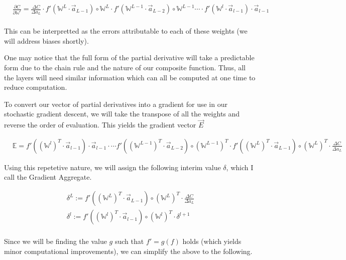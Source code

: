 \documentclass[8pt]{amsart}
\newcommand\mat[1]{\mathbb{#1}}
\begin{document}
\[
    \begin{aligned}
        & \frac{ \partial C }{ \partial \mat{W}^l } = \frac{ \Delta C }{ \Delta a_L }
            \cdot
                f'(\mat{W}^L \cdot \vec{a}_{L - 1}) \circ \mat{W}^L
            \cdot
                f'(\mat{W}^{L - 1} \cdot \vec{a}_{L - 2}) \circ \mat{W}^{L - 1}
            \cdots
            \cdot
                f'(\mat{W}^l \cdot \vec{a}_{l - 1}) \cdot \vec{a}_{l - 1} \\
    \end{aligned}
\]

This can be interpretted as the errors attributable to each of these weights (we will
address biases shortly).

One may notice that the full form of the partial derivative will take a
predictable form due to the chain rule and the nature of our composite function.
Thus, all the layers will need similar information which can all be computed
at one time to reduce computation.

To convert our vector of partial derivatives into a gradient for use in our stochastic
gradient descent, we will take the transpose of all the weights and reverse the order
of evaluation. This yields the gradient vector $\vec{E}$

\[
    \begin{aligned}
        & \mat{E} = f'( (\mat{W}^l)^T \cdot \vec{a}_{l - 1}) \cdot \vec{a}_{l - 1}
            \cdot
            \cdots
                f'( (\mat{W}^{L - 1})^T \cdot \vec{a}_{L - 2} ) \circ (\mat{W}^{L - 1})^T
            \cdot
                f'( (\mat{W}^L)^T \cdot \vec{a}_{L - 1} ) \circ (\mat{W}^L)^T
            \cdot
                \frac{ \Delta C }{ \Delta a_L }
    \end{aligned}
\]

Using this repetetive nature, we will assign the following interim value $\delta$,
which I call the Gradient Aggregate.

\[
    \begin{aligned}
        \delta^L := f'( (\mat{W}^L)^T \cdot \vec{a}_{L - 1} ) \circ (\mat{W}^L)^T \cdot \frac{ \Delta C }{ \Delta a_L } \\
        \delta^l := f'( (\mat{W}^{l})^T \cdot \vec{a}_{l - 1} ) \circ (\mat{W}^{l})^T \cdot \delta^{l + 1} \\
    \end{aligned}
\]

Since we will be finding the value $g$ such that $f' = g(f)$ holds (which yields minor
computational improvements), we can simplify the above to the following.
\end{document}
